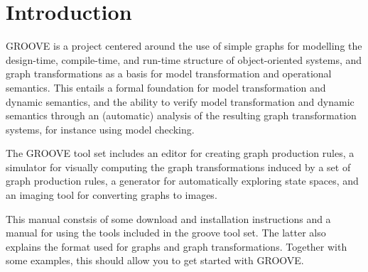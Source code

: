 \section{Introduction}

GROOVE is a project centered around the use of simple graphs for
modelling the design-time, compile-time, and run-time structure of
object-oriented systems, and graph transformations as a basis for
model transformation and operational semantics. This entails a formal
foundation for  model transformation and dynamic semantics, and the
ability to verify model transformation and dynamic semantics through
an (automatic) analysis of the resulting graph transformation systems,
for instance using model checking.

The GROOVE tool set includes an editor for creating graph production
rules, a simulator for visually computing the graph transformations
induced by a set of graph production rules, a generator for
automatically exploring state spaces, and an imaging tool for
converting graphs to images.

This manual constsis of some download and installation instructions
and a manual for using the tools included in the groove tool set. The
latter also explains the format used for graphs and graph
transformations. Together with some examples, this should allow you to
get started with GROOVE.